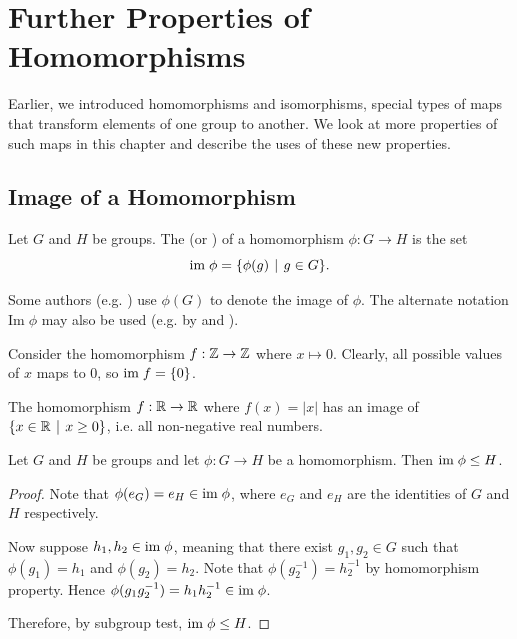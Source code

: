 \chapter{Further Properties of Homomorphisms}
Earlier, we introduced homomorphisms and isomorphisms, special types of maps that transform elements of one group to another. We look at more properties of such maps in this chapter and describe the uses of these new properties.

\section{Image of a Homomorphism}
\begin{definition}
    Let $G$ and $H$ be groups. The  (or ) of a homomorphism $\phi: G \to H$ is the set
    \[
        \im\phi = \{\phi(g) \vert g \in G\}.
    \]
\end{definition}
\begin{remark}
    Some authors (e.g. \cite[p.~6]{judson_beezer_2022}) use $\phi(G)$ to denote the image of $\phi$. The alternate notation $\mathrm{Im}\;\phi$ may also be used (e.g. by \cite[Definition I.2.2]{hungerford_1980} and \cite[\S 66]{clark_1984}).
\end{remark}

\begin{example}
    Consider the homomorphism $f: \mathbb{Z} \to \mathbb{Z}$ where $x \mapsto 0$. Clearly, all possible values of $x$ maps to 0, so $\mathrm{im}\; f = \{0\}$.
\end{example}

\begin{example}
    The homomorphism $f: \mathbb{R} \to \mathbb{R}$ where $f(x) = |x|$ has an image of $\{x \in \R \vert x \geq 0\}$, i.e. all non-negative real numbers.
\end{example}

\begin{proposition}\label{prop-image-is-subgroup-of-codomain}
    Let $G$ and $H$ be groups and let $\phi: G \to H$ be a homomorphism. Then $\mathrm{im}\;\phi \leq H$.
\end{proposition}
\begin{proof}
    Note that $\phi(e_G) = e_H \in \mathrm{im}\;\phi$, where $e_G$ and $e_H$ are the identities of $G$ and $H$ respectively.

    Now suppose $h_1, h_2 \in \mathrm{im}\;\phi$, meaning that there exist $g_1, g_2 \in G$ such that $\phi(g_1) = h_1$ and $\phi(g_2) = h_2$. Note that $\phi(g_2^{-1}) = h_2^{-1}$ by homomorphism property. Hence $\phi(g_1g_2^{-1}) = h_1h_2^{-1} \in \mathrm{im}\;\phi$.

    Therefore, by subgroup test, $\mathrm{im}\;\phi \leq H$.
\end{proof}

